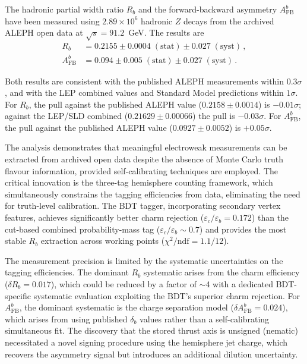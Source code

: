 \documentclass[11pt,a4paper]{article}
\begin{document}
The hadronic partial width ratio $R_b$ and the forward-backward
asymmetry $A_\mathrm{FB}^b$ have been measured using $2.89 \times 10^6$
hadronic $Z$ decays from the archived ALEPH open data at
$\sqrt{s} = 91.2$~GeV.  The results are
\begin{align*}
  R_b &= 0.2155 \pm 0.0004\;\mathrm{(stat)} \pm 0.027\;\mathrm{(syst)}\,,\\
  A_\mathrm{FB}^b &= 0.094 \pm 0.005\;\mathrm{(stat)} \pm 0.027\;\mathrm{(syst)}\,.
\end{align*}

Both results are consistent with the published ALEPH measurements within
$0.3\sigma$, and with the LEP combined values and Standard Model predictions
within $1\sigma$.  For $R_b$, the pull against the published ALEPH value
($0.2158 \pm 0.0014$) is $-0.01\sigma$; against the LEP/SLD combined
($0.21629 \pm 0.00066$) the pull is $-0.03\sigma$.  For $A_\mathrm{FB}^b$,
the pull against the published ALEPH value ($0.0927 \pm 0.0052$) is
$+0.05\sigma$.

The analysis demonstrates that meaningful electroweak measurements can be
extracted from archived open data despite the absence of Monte Carlo truth
flavour information, provided self-calibrating techniques are employed.
The critical innovation is the three-tag hemisphere counting framework,
which simultaneously constrains the tagging efficiencies from data,
eliminating the need for truth-level calibration.  The BDT tagger,
incorporating secondary vertex features, achieves significantly better
charm rejection ($\varepsilon_c/\varepsilon_b = 0.172$) than the
cut-based combined probability-mass tag ($\varepsilon_c/\varepsilon_b
\sim 0.7$) and provides the most stable $R_b$ extraction across
working points ($\chi^2/\mathrm{ndf} = 1.1/12$).

The measurement precision is limited by the systematic uncertainties on
the tagging efficiencies.  The dominant $R_b$ systematic arises from the
charm efficiency ($\delta R_b = 0.017$), which could be reduced by a
factor of $\sim$4 with a dedicated BDT-specific systematic evaluation
exploiting the BDT's superior charm rejection.  For $A_\mathrm{FB}^b$,
the dominant systematic is the charge separation model
($\delta A_\mathrm{FB}^b = 0.024$), which arises from using published
$\delta_b$ values rather than a self-calibrating simultaneous fit.
The discovery that the stored thrust axis is unsigned (nematic)
necessitated a novel signing procedure using the hemisphere jet charge,
which recovers the asymmetry signal but introduces an additional
dilution uncertainty.
\end{document}
